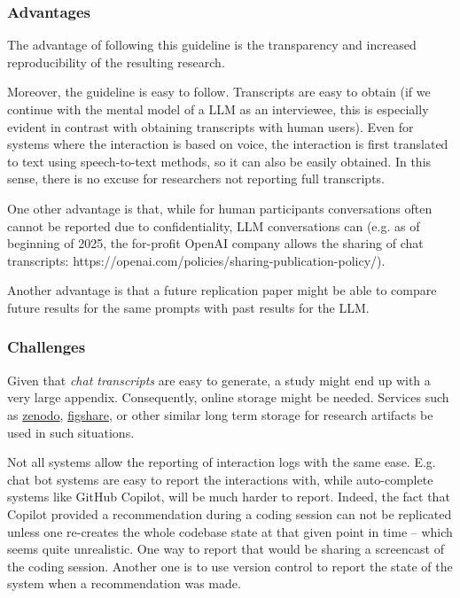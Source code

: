 \subsubsection{Advantages}

The advantage of following this guideline is the transparency and increased reproducibility of the resulting research. 

Moreover, the guideline is easy to follow. Transcripts are easy to obtain (if we continue with the mental model of a LLM as an interviewee, this is especially evident in contrast with obtaining transcripts with human users). Even for systems where the interaction is based on voice, the interaction is first translated to text using speech-to-text methods, so it can also be easily obtained. In this sense, there is no excuse for researchers not reporting full transcripts. 

One other advantage is that, while for human participants conversations often cannot be reported due to confidentiality, LLM conversations can (e.g. as of beginning of 2025, the for-profit OpenAI company allows the sharing of chat transcripts: https://openai.com/policies/sharing-publication-policy/). 


Another advantage is that a future replication paper might be able to compare future results for the same prompts with past results for the LLM.


\subsubsection{Challenges}

Given that {\em chat transcripts} are easy to generate, a study might end up with a very large appendix. Consequently, online storage might be needed. Services such as \href{https://zenodo.org}{zenodo}, \href{https://figshare.com/}{figshare}, or other similar long term storage for research artifacts \should be used in such situations.

Not all systems allow the reporting of interaction logs with the same ease. E.g. chat bot systems are easy to report the interactions with, while auto-complete systems like GitHub Copilot, will be much harder to report. Indeed, the fact that Copilot provided a recommendation during a coding session can not be replicated unless one re-creates the whole codebase state at that given point in time -- which seems quite unrealistic. One way to report that would be sharing a screencast of the coding session. Another one is to use version control to report the state of the system when a recommendation was made.

